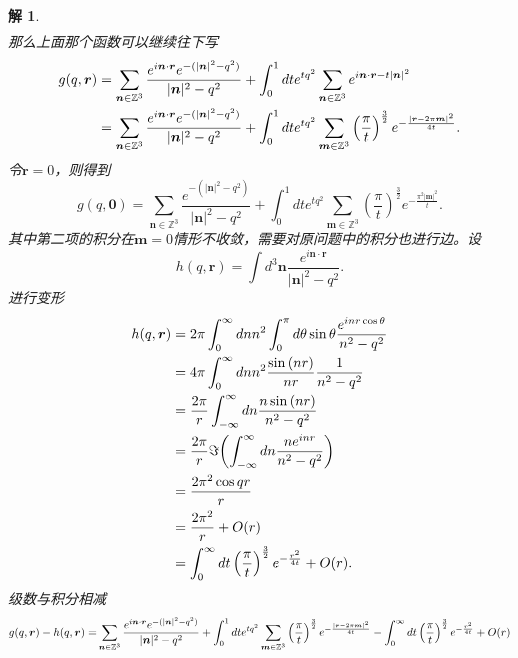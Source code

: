 \documentclass[10pt]{ctexart}
\newtheorem*{solution}{解}
\begin{document}
\begin{solution}
\begin{align}
    \end{align}
    那么上面那个函数可以继续往下写
    \begin{align}
        g(q,\bm{r})&=\sum\limits_{\bm{n}\in\mathbb{Z}^3}\frac{e^{i\bm{n}\cdot\bm{r}}e^{-(\lvert\bm{n}\rvert^2-q^2)}}{\lvert\bm{n}\rvert^2-q^2}
        +\int_{0}^{1}dt e^{tq^2}\sum\limits_{\bm{n}\in\mathbb{Z}^3}e^{i\bm{n}\cdot\bm{r}-t\lvert\bm{n}\rvert^2}\notag\\
        &=\sum\limits_{\bm{n}\in\mathbb{Z}^3}\frac{e^{i\bm{n}\cdot\bm{r}}e^{-(\lvert\bm{n}\rvert^2-q^2)}}{\lvert\bm{n}\rvert^2-q^2}+
        \int_{0}^{1}dte^{tq^2}\sum\limits_{\bm{m}\in\mathbb{Z}^3}\left(\frac{\pi}{t}\right)^{\frac{3}{2}}e^{-\frac{\lvert\bm{r}-2\pi\bm{m}\rvert^2}{4t}}.\notag
    \end{align}
    令$\bm{r}=0$，则得到
    $$ g(q,\bm{0})=\sum\limits_{\bm{n}\in\mathbb{Z}^3}\frac{e^{-(\lvert\bm{n}\rvert^2-q^2)}}{\lvert\bm{n}\rvert^2-q^2}+
        \int_{0}^{1}dte^{tq^2}\sum\limits_{\bm{m}\in\mathbb{Z}^3}\left(\frac{\pi}{t}\right)^{\frac{3}{2}}e^{-\frac{\pi^2\lvert\bm{m}\rvert^2}{t}}.$$
    其中第二项的积分在$\bm{m}=0$情形不收敛，需要对原问题中的积分也进行边。设
    $$h(q,\bm{r})=\int d^3\bm{n}\frac{e^{i\bm{n}\cdot\bm{r}}}{\lvert\bm{n}\rvert^2-q^2}.$$
    进行变形
    \begin{align}
        h(q,\bm{r})&=2\pi\int_{0}^{\infty}dnn^2\int_{0}^{\pi}d\theta\sin{\theta}\frac{e^{inr\cos{\theta}}}{n^2-q^2}\notag\\
        &=4\pi\int_{0}^{\infty}dnn^2\frac{\sin{(nr)}}{nr}\frac{1}{n^2-q^2}\notag\\
        &=\frac{2\pi}{r}\int_{-\infty}^{\infty}dn\frac{n\sin{(nr)}}{n^2-q^2}\notag\\
        &=\frac{2\pi}{r}\Im{\left(\int_{-\infty}^{\infty}dn\frac{ne^{inr}}{n^2-q^2}\right)}\notag\\
        &=\frac{2\pi^2\cos{qr}}{r}\notag\\
        &=\frac{2\pi^2}{r}+O(r)\notag\\
        &=\int_{0}^{\infty}dt \left(\frac{\pi}{t}\right)^{\frac{3}{2}}e^{-\frac{r^2}{4t}}+O(r).\notag
    \end{align}
    级数与积分相减
    \begin{align}
        g(q,\bm{r})-h(q,\bm{r})=&\sum\limits_{\bm{n}\in\mathbb{Z}^3}\frac{e^{i\bm{n}\cdot\bm{r}}e^{-(\lvert\bm{n}\rvert^2-q^2)}}{\lvert\bm{n}\rvert^2-q^2}+
        \int_{0}^{1}dte^{tq^2}\sum\limits_{\bm{m}\in\mathbb{Z}^3}\left(\frac{\pi}{t}\right)^{\frac{3}{2}}e^{-\frac{\lvert\bm{r}-2\pi\bm{m}\rvert^2}{4t}}-\int_{0}^{\infty}dt \left(\frac{\pi}{t}\right)^{\frac{3}{2}}e^{-\frac{r^2}{4t}}+O(r)\notag\\

\end{align}
\end{solution}
\end{document}
